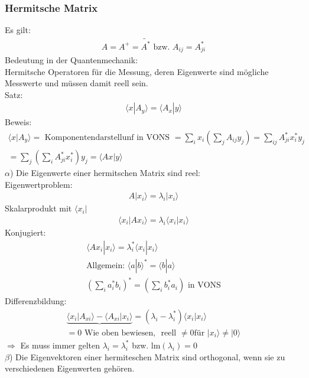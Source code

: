 \documentclass{article}
\begin{document}
\subsubsection{Hermitsche Matrix}
Es gilt:\begin{eqnarray*}
    A = A^+ = \tilde{A^*} \text{ bzw. } A_{ij} = A_{ji}^*
\end{eqnarray*}
Bedeutung in der Quantenmechanik:\\
Hermitsche Operatoren für die Messung, deren Eigenwerte sind mögliche Messwerte und müssen damit reell sein.\\
Satz: \begin{eqnarray*}
    \langle x | A_y\rangle = \langle A_x | y\rangle
\end{eqnarray*}
Beweis:
\begin{eqnarray*}
    \langle x | A_y \rangle = \text{ Komponentendarstellunf in VONS } = \sum_{i} x_i \left(\sum_{j}A_{ij}y_j\right) = \sum_{ij}A_{ji}^*x_i^*y_j\\
    = \sum_{j} \left(\sum_{i} A_{ji}^*x_i^*\right)y_j = \langle Ax|y\rangle
\end{eqnarray*}
$\alpha$) Die Eigenwerte einer hermitschen Matrix sind reel:\\
Eigenwertproblem: \begin{eqnarray*}
    A|x_i\rangle = \lambda_i|x_i\rangle
\end{eqnarray*}
Skalarprodukt mit $\langle x_i|$\begin{eqnarray*}
    \langle x_i|Ax_i\rangle = \lambda_i\langle x_i|x_i\rangle
\end{eqnarray*}
Konjugiert:\begin{eqnarray*}
    \langle Ax_i|x_i \rangle = \lambda_i^* \langle x_i|x_i\rangle\\
    \text{Allgemein: } \langle a|b\rangle ^* = \langle b|a\rangle\\
    \left(\sum_{i}a_i^*b_i\right)^* = \left(\sum_{i}b_i^*a_i\right) \text{ in VONS}
\end{eqnarray*}
Differenzbildung:
\begin{eqnarray*}
    \underbrace{\langle x_i|A_{xi}\rangle - \langle A_{xi}|x_i\rangle} = \left(\lambda_i-\lambda_i^*\right)\langle x_i|x_i\rangle\\
    = 0\text{ Wie oben bewiesen},\,\text{ reell } \neq 0 \text{für } |x_i\rangle \neq |0\rangle
\end{eqnarray*}
$\Rightarrow$ Es muss immer gelten $\lambda_i = \lambda_i^*$ bzw. lm$(\lambda_i)=0$\\
$\beta$) Die Eigenvektoren einer hermiteschen Matrix sind orthogonal, wenn sie zu verschiedenen Eigenwerten gehören.\
\end{document}
